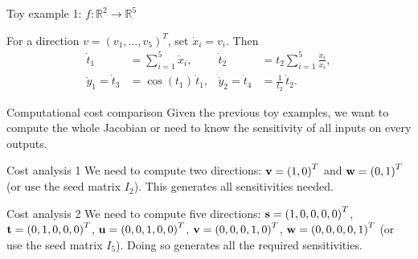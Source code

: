 \documentclass[12pt,xcolor={table}]{beamer}
\newcommand{\sbf}{{\bf s}}
\newcommand{\tbf}{{\bf t}}
\newcommand{\ubf}{{\bf u}}
\newcommand{\vbf}{{\bf v}}
\newcommand{\wbf}{{\bf w}}
\begin{document}
\begin{frame}{Toy example 1: $f:\mathbb{R}^2 \to \mathbb{R}^5$}
  \begin{center}
  \end{center}

  For a direction $v=(v_1,\ldots,v_5)^T$, set $\dot{x}_i=v_i$. Then
  \begin{align*}
    \dot{t}_1 &= \sum_{i=1}^5 \dot{x}_i,  & \dot{t}_2 &= t_2 \sum_{i=1}^5 \frac{\dot{x}_i}{x_i}, \\
    \dot{y}_1 = \dot{t}_3 &= \cos(t_1)\,\dot{t}_1,    & \dot{y}_2 = \dot{t}_4 &= \frac{1}{t_2}\,\dot{t}_2.
  \end{align*}
\end{frame}

\begin{frame}{Computational cost comparison}
  Given the previous toy examples, we want to compute the whole Jacobian or need to know the sensitivity of all inputs on every outputs.
  
  \begin{block}{Cost analysis 1}
    We need to compute two directions: $\vbf = \left( 1, 0 \right)^T$ and $\wbf = \left( 0, 1\right)^T$ (or use the seed matrix $I_2$).
    This generates all sensitivities needed.
  \end{block}

  \begin{block}{Cost analysis 2}
    We need to compute five directions: $\sbf = \left( 1, 0, 0, 0, 0 \right)^T$, $\tbf = \left( 0, 1, 0, 0, 0\right)^T$, $\ubf = \left( 0, 0, 1, 0, 0\right)^T$, $\vbf = \left( 0, 0, 0, 1, 0\right)^T$, $\wbf = \left( 0, 0, 0, 0, 1\right)^T$ (or use the seed matrix $I_5$).
    Doing so generates all the required sensitivities.
  \end{block}
  
\end{frame}
\end{document}
